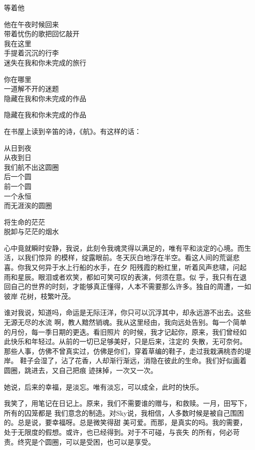 			等着他

			他在午夜时候回来 \\
			带着忧伤的歌把回忆敲开 \\
			我在这里 \\
			手提着沉沉的行李 \\
			迷失在我和你未完成的旅行

			你在哪里 \\
			一道解不开的迷题 \\
			隐藏在我和你未完成的作品

			隐藏在我和你未完成的作品
		\endlongpoem

	\endwriting



		在书屋上读到辛笛的诗，《航》。有这样的话：

		\longpoem{}{}{}
			从日到夜 \\
			从夜到日 \\
			我们航不出这圆圈 \\
			后一个圆 \\
			前一个圆 \\
			一个永恒 \\
			而无涯涘的圆圈

			将生命的茫茫 \\
			脱卸与茫茫的烟水
		\endlongpoem


		心中竟就瞬时安静，我说，此刻令我魂灵得以满足的，唯有平和淡定的心境。而生活，以我们惊异
	的模样，绽露眼前。冬天灰白地浮在半空。看这人间的荒诞悲喜。你我又何异于水上行船的水手，在夕
	阳残霞的粉红里，听着风声悲啸，问起雨和星辰。眼泪或者欢笑，都如可笑可叹的表演，何须在意。似
	乎，我只有在退回自己的世界的时刻，才能够真正懂得，人本不需要那么许多。独自的周遭，一如彼岸
	花树，枝繁叶茂。


		谁对我说，知道吗，命运是无际汪洋，你只可以沉浮其中，却永远游不出去。这些无源无尽的水流
	啊，教人黯然销魂。我从这里经由，我向远处告别。每一个简单的月份，每一季日期的更迭。看旧照片
	的时候，我才记起你，原来，我们曾经如此快乐和年轻过。从前的一切已足够美好，只是后来，注定的
	失散，无可奈何。那些人事，仿佛不曾真实过，仿佛是你们，穿着草编的鞋子，走过我栽满桃杏的堤岸。
	鞋子会湿了，沾了花香，人却渐行渐远，消隐在彼此的生命。我们好似画着圆圈，跳进去，又自己把痕
	迹抹掉，一次又一次。


		她说，后来的幸福，是淡忘。唯有淡忘，可以成全，此时的快乐。

		我笑了，用笔记在日记上。原来，我们不需要谁的赠与，和救赎。一月，田写下，所有的囚笼都是
	我们意念的制造。对Sky说，我相信，人多数时候是被自己围困的。总是说，要幸福呀。总是微笑得甜
	美可爱。而那，是真实的吗。我的需要，处于无限度的假想。或许，也已经得到。对于不可碰，与丧失
	的所有，何必苛责。终究是个圆圈，可以是受困，也可以是享受。


